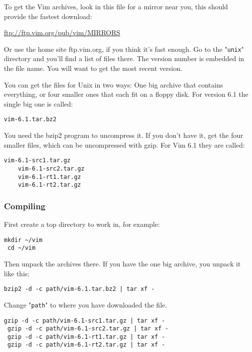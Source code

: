 To get the Vim archives, look in this file for a mirror near you, this should provide the fastest download:

    \url{ftp://ftp.vim.org/pub/vim/MIRRORS} 

Or use the home site ftp.vim.org, if you think it's fast enough.
Go to the "\verb!unix!" directory and you'll find a list of files there.
The version number is embedded in the file name.
You will want to get the most recent version.

You can get the files for Unix in two ways: One big archive that contains everything, or four smaller ones that each fit on a floppy disk.
For version 6.1 the single big one is called:

\begin{Verbatim}[samepage=true]
    vim-6.1.tar.bz2 
\end{Verbatim}

You need the bzip2 program to uncompress it.
If you don't have it, get the four smaller files, which can be uncompressed with gzip.
For Vim 6.1 they are called:

\begin{Verbatim}[samepage=true]
    vim-6.1-src1.tar.gz 
    vim-6.1-src2.tar.gz 
    vim-6.1-rt1.tar.gz 
    vim-6.1-rt2.tar.gz 
\end{Verbatim}

\subsubsection{Compiling}
First create a top directory to work in, for example:

\begin{Verbatim}[samepage=true]
 mkdir ~/vim
 cd ~/vim
\end{Verbatim}

Then unpack the archives there.
If you have the one big archive, you unpack it like this:

\begin{Verbatim}[samepage=true]
 bzip2 -d -c path/vim-6.1.tar.bz2 | tar xf -
\end{Verbatim}

Change "\verb!path!" to where you have downloaded the file.

\begin{Verbatim}[samepage=true]
 gzip -d -c path/vim-6.1-src1.tar.gz | tar xf -
 gzip -d -c path/vim-6.1-src2.tar.gz | tar xf -
 gzip -d -c path/vim-6.1-rt1.tar.gz | tar xf -
 gzip -d -c path/vim-6.1-rt2.tar.gz | tar xf -
\end{Verbatim}

